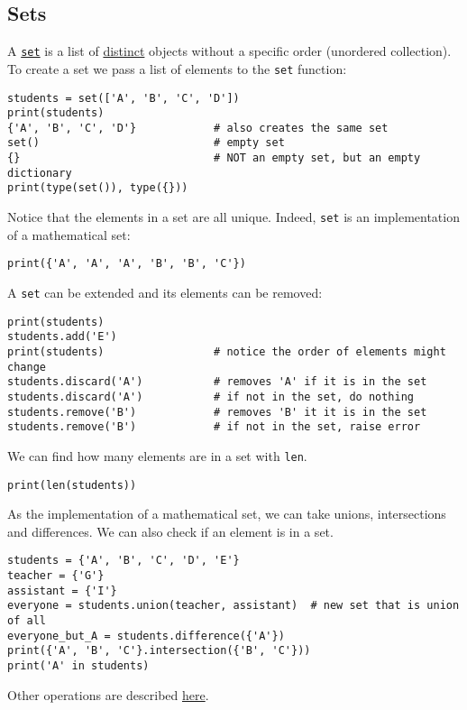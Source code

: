 \documentclass[12pt, a4paper]{article}
\begin{document}
\subsection{Sets}
\label{sec:org9a77b70}
A \href{https://docs.python.org/3.6/library/stdtypes.html\#set}{\texttt{set}} is a list of \uline{distinct} objects without a specific order (unordered collection).
To create a set we pass a list of elements to the \texttt{set} function:
\lstset{language=jupyter-python,label= ,caption= ,captionpos=b,numbers=none}
\begin{lstlisting}
students = set(['A', 'B', 'C', 'D'])
print(students)
{'A', 'B', 'C', 'D'}            # also creates the same set
set()                           # empty set
{}                              # NOT an empty set, but an empty dictionary
print(type(set()), type({}))
\end{lstlisting}

Notice that the elements in a set are all unique. Indeed, \texttt{set} is an implementation of a mathematical set:
\lstset{language=jupyter-python,label= ,caption= ,captionpos=b,numbers=none}
\begin{lstlisting}
print({'A', 'A', 'A', 'B', 'B', 'C'})
\end{lstlisting}

A \texttt{set} can be extended and its elements can be removed:
\lstset{language=jupyter-python,label= ,caption= ,captionpos=b,numbers=none}
\begin{lstlisting}
print(students)
students.add('E')
print(students)                 # notice the order of elements might change
students.discard('A')           # removes 'A' if it is in the set
students.discard('A')           # if not in the set, do nothing
students.remove('B')            # removes 'B' it it is in the set
students.remove('B')            # if not in the set, raise error
\end{lstlisting}

We can find how many elements are in a set with \texttt{len}.
\lstset{language=jupyter-python,label= ,caption= ,captionpos=b,numbers=none}
\begin{lstlisting}
print(len(students))
\end{lstlisting}

As the implementation of a mathematical set, we can take unions, intersections and differences. We can also check if an element is in a set.
\lstset{language=jupyter-python,label= ,caption= ,captionpos=b,numbers=none}
\begin{lstlisting}
students = {'A', 'B', 'C', 'D', 'E'}
teacher = {'G'}
assistant = {'I'}
everyone = students.union(teacher, assistant)  # new set that is union of all
everyone_but_A = students.difference({'A'})
print({'A', 'B', 'C'}.intersection({'B', 'C'}))
print('A' in students)
\end{lstlisting}
Other operations are described \href{https://docs.python.org/3.6/library/stdtypes.html\#set}{here}.
\end{document}
